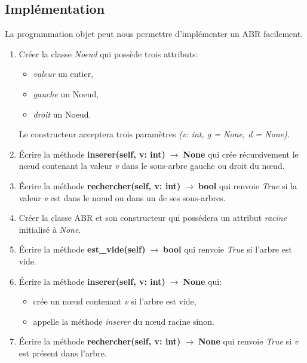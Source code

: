 \documentclass[a4paper,11pt]{article}
\begin{document}
\begin{Form}
\section{Implémentation}
La programmation objet peut nous permettre d'implémenter un ABR facilement.
\begin{activite}
\begin{enumerate}
\item Créer la classe \emph{Noeud} qui possède trois attributs:
\begin{itemize}
\item \emph{valeur} un entier,
\item \emph{gauche} un Noeud,
\item \emph{droit} un Noeud.
\end{itemize}
Le constructeur acceptera trois paramètres \emph{(v: int, g = None, d = None)}. 
\item Écrire la méthode \textbf{inserer(self, v: int)$\;\rightarrow\;$None} qui crée récursivement le nœud contenant la valeur \emph{v} dans le sous-arbre gauche ou droit du nœud.
\item Écrire la méthode \textbf{rechercher(self, v: int)$\;\rightarrow\;$bool} qui renvoie \emph{True} si la valeur \emph{v} est dans le nœud ou dans un de ses sous-arbres.
\item Créer la classe ABR et son constructeur qui possédera un attribut \emph{racine} initialisé à \emph{None}.
\item Écrire la méthode \textbf{est\_vide(self)$\;\rightarrow\;$bool} qui renvoie \emph{True} si l'arbre est vide.
\item Écrire la méthode \textbf{inserer(self, v: int)$\;\rightarrow\;$None} qui:
\begin{itemize}
\item crée un nœud contenant \emph{v} si l'arbre est vide,
\item appelle la méthode \emph{inserer} du nœud racine sinon.
\end{itemize}
\item Écrire la méthode \textbf{rechercher(self, v: int)$\;\rightarrow\;$None} qui renvoie \emph{True} si \emph{v} est présent dans l'arbre.
\end{enumerate}
\end{activite}
\end{Form}
\end{document}
